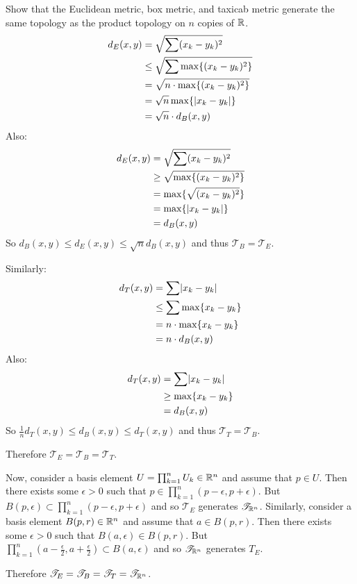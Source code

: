 \documentclass[letterpaper,12pt,fleqn]{article}
\newcommand{\T}{\mathscr{T}}
\newcommand{\e}{\epsilon}
\begin{document}
\begin{example}[Exercise 9.4]
  Show that the Euclidean metric, box metric, and taxicab metric generate the same topology as the product
  topology on \(n\) copies of \(\mathbb{R}\).
  \begin{align*}
    d_E(x,y) &= \sqrt{\sum(x_k-y_k)^2} \\
    &\le \sqrt{\sum\max\{(x_k-y_k)^2\}} \\
    &= \sqrt{n\cdot\max\{(x_k-y_k)^2\}} \\
    &=\sqrt{n}\max\{\lvert x_k-y_k\rvert\} \\
    &= \sqrt{n}\cdot d_B(x,y) \\
  \end{align*}
  Also:
  \begin{align*}
    d_E(x,y) &= \sqrt{\sum(x_k-y_k)^2} \\
    &\ge \sqrt{\max\{(x_k-y_k)^2\}} \\
    &= \max\{\sqrt{(x_k-y_k)^2}\} \\
    &= \max\{\lvert x_k-y_k\rvert\} \\
    &= d_B(x,y)
  \end{align*}
  So \(d_B(x,y)\le d_E(x,y)\le\sqrt{n}d_B(x,y)\) and thus \(\T_B=\T_E\).

  Similarly:
  \begin{align*}
    d_T(x,y) &= \sum\lvert x_k-y_k\rvert \\
    &\le \sum\max\{x_k-y_k\} \\
    &= n\cdot\max\{x_k-y_k\} \\
    &= n\cdot d_B(x,y)
  \end{align*}
  Also:
  \begin{align*}
    d_T(x,y) &= \sum\lvert x_k-y_k\rvert \\
    &\ge \max\{x_k-y_k\} \\
    &= d_B(x,y)
  \end{align*}
  So \(\frac{1}{n}d_T(x,y)\le d_B(x,y)\le d_T(x,y)\) and thus \(\T_T=\T_B\).

  Therefore \(\T_E=\T_B=\T_T\).

  Now, consider a basis element \(U=\prod_{k=1}^nU_k\in\mathbb{R}^n\) and assume that \(p\in U\).  Then there exists some
  \(\e>0\) such that \(p\in\prod_{k=1}^n(p-\e,p+\e)\).  But \(B(p,\e)\subset\prod_{k=1}^n(p-\e,p+\e)\) and so
  \(\T_E\) generates \(\T_{\R^n}\).  Similarly, consider a basis element \(B(p,r)\in\mathbb{R}^n\) and assume that
  \(a\in B(p,r)\).  Then there exists some \(\e>0\) such that \(B(a,\e)\in B(p,r)\).  But
  \(\prod_{k=1}^n\left(a-\frac{\e}{2},a+\frac{\e}{2}\right)\subset B(a,\e)\) and so \(\T_{\R^n}\) generates \(T_E\).

  Therefore \(\T_E=\T_B=\T_T=\T_{\R^n}\).
\end{example}
\end{document}

